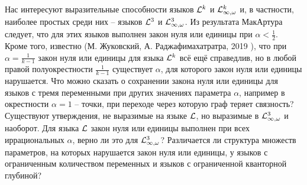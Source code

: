 Нас интересуют выразительные способности языков $\mathcal{L}^k$ и $\mathcal{L}^k_{\infty, \omega}$ и, в частности, наиболее простых среди них -- языков  $\mathcal{L}^3$ и $\mathcal{L}^3_{\infty, \omega}$.
Из результата МакАртура \cite{mcarthur1997asymptotic} следует, что для этих языков выполнен закон нуля или единицы при $\alpha < \frac{1}{2}$.
Кроме того, известно (М. Жуковский, А. Раджафимахатратра, 2019 \cite{razafimahatratra2019zero}), что при $\alpha = \frac{1}{k-1}$ закон нуля или единицы для языка $\mathcal{L}^k$ всё ещё справедлив, но в любой правой полуокрестности $\frac{1}{k-1}$ существует $\alpha$, для которого закон нуля или единицы нарушается.
Что можно сказать о сохранении закона нуля или единицы для языков с тремя переменными при других значениях параметра $\alpha$, например в окрестности $\alpha=1$ -- точки, при переходе через которую граф теряет связность?
Существуют утверждения, не выразимые на языке $\mathcal{L}$, но выразимые в $\mathcal{L}^3_{\infty, \omega}$ и наоборот.
Для языка $\mathcal{L}$ закон нуля или единицы выполнен при всех иррациональных $\alpha$, верно ли это для $\mathcal{L}^3_{\infty, \omega}$?
Различается ли структура множеств параметров, на которых нарушается закон нуля или единицы, у языков с ограниченным количеством переменных и языков с ограниченной кванторной глубиной? 